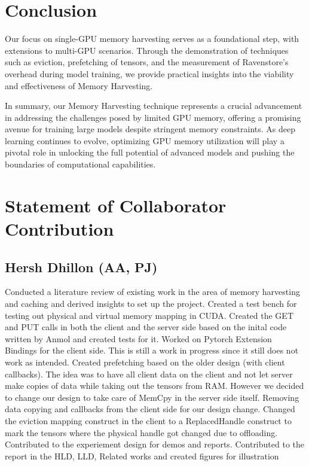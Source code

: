 \documentclass{article}
\begin{document}
\section{Conclusion}
Our focus on single-GPU memory harvesting serves as a foundational step, with extensions to multi-GPU scenarios. Through the demonstration of 
techniques such as eviction, prefetching of tensors, and the measurement of Ravenstore's overhead during model training, we provide practical insights into the viability and effectiveness of Memory Harvesting.

In summary, our Memory Harvesting technique represents a crucial advancement in addressing the challenges posed by limited GPU memory, offering a promising avenue 
for training large models despite stringent memory constraints. As deep learning continues to evolve, optimizing GPU memory utilization will play a pivotal role 
in unlocking the full potential of advanced models and pushing the boundaries of computational capabilities.

\section{Statement of Collaborator Contribution}
\subsection{Hersh Dhillon (AA, PJ)}
Conducted a literature review of existing work in the area of memory harvesting and caching and derived insights to set up the project.
Created a test bench for testing out physical and virtual memory mapping in CUDA.
Created the GET and PUT calls in both the client and the server side based on the inital code written by Anmol and created tests for it.
Worked on Pytorch Extension Bindings for the client side. This is still a work in progress since it still does not work as intended.
Created prefetching based on the older design (with client callbacks). The idea was to have all client data on the client and not let server make copies of data while taking out the tensors from RAM. However we decided to change our design to take care of MemCpy in the server side itself.
Removing data copying and callbacks from the client side for our design change. Changed the eviction mapping construct in the client to a ReplacedHandle construct to mark the tensors where the physical handle got changed due to offloading.
Contributed to the experiement design for demos and reports.
Contributed to the report in the HLD, LLD, Related works and created figures for illustration
\end{document}
